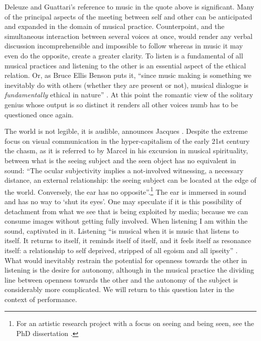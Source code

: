 \documentclass[a4paper]{article}
\begin{document}
Deleuze and Guattari's reference to music in the quote above is significant. Many of the principal aspects of the meeting between self and other can be anticipated and expanded in the domain of musical practice. Counterpoint, and the simultaneous interaction between several voices at once, would render any verbal discussion incomprehensible and impossible to follow whereas in music it may even do the opposite, create a greater clarity. To listen is a fundamental of all musical practices and listening to the other is an essential aspect of the ethical relation. Or, as Bruce Ellis Benson puts it, ``since music making is something we inevitably do with others (whether they are present or not), musical dialogue is \emph{fundamentally} ethical in nature'' \citep[p. 164]{benson03}. At this point the romantic view of the solitary genius whose output is so distinct it renders all other voices numb has to be questioned once again.

The world is not legible, it is audible, announces Jacques \citet[p. 3]{attali85}. Despite the extreme focus on visual communication in the hyper-capitalism of the early 21st century the chasm, as it is referred to by Marcel \citet{cobussen08} in his excursion in musical spirituality, between what is the seeing subject and the seen object has no equivalent in sound: ``The ocular subjectivity implies a not-involved witnessing, a necessary distance, an external relationship: the seeing subject can be located at the edge of the world. Conversely, the ear has no opposite''.\footnote{For an artistic research project with a focus on seeing and being seen, see the PhD dissertation \citet{leiderstam06}.} The ear is immersed in sound and has no way to `shut its eyes'. One may speculate if it is this possibility of detachment from what we see that is being exploited by media; because we can consume images without getting fully involved. When listening I am within the sound, captivated in it. Listening ``is musical when it is music that listens to itself. It returns to itself, it reminds itself of itself, and it feels itself as resonance itself: a relationship to self deprived, stripped of all egoism and all ipseity'' \citep[p. 67]{nancy2007}. What would inevitably restrain the potential for openness towards the other in listening is the desire for autonomy, although in the musical practice the dividing line between openness towards the other and the autonomy of the subject is considerably more complicated. We will return to this question later in the context of performance.
\end{document}
